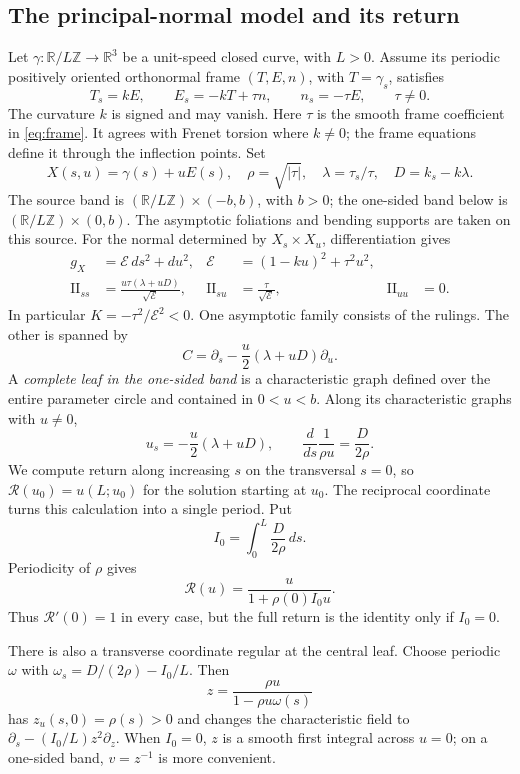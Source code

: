 \documentclass[11pt]{amsart}
\theoremstyle{definition}
\theoremstyle{remark}
\newcommand{\R}{\mathbb R}\newcommand{\Sph}{\mathbb S}
\newcommand{\II}{\mathrm{II}}\newcommand{\Gmap}{\mathcal G}
\numberwithin{equation}{section}
\begin{document}
\subsection{The principal-normal model and its return}
Let $\gamma:\R/L\mathbb Z\to\R^3$ be a unit-speed closed curve,
with $L>0$. Assume its
periodic positively oriented orthonormal frame $(T,E,n)$, with
$T=\gamma_s$, satisfies
\begin{equation}\label{eq:frame}
 T_s=kE,\qquad E_s=-kT+\tau n,\qquad n_s=-\tau E,
 \qquad \tau\ne0.
\end{equation}
The curvature $k$ is signed and may vanish. Here $\tau$ is the
smooth frame coefficient in \eqref{eq:frame}. It agrees with Frenet
torsion where $k\ne0$; the frame equations define it through the
inflection points. Set
\[
 X(s,u)=\gamma(s)+uE(s),\quad \rho=\sqrt{|\tau|},\quad
 \lambda=\tau_s/\tau,\quad D=k_s-k\lambda.
\]
The source band is $(\R/L\mathbb Z)\times(-b,b)$, with $b>0$;
the one-sided band below is $(\R/L\mathbb Z)\times(0,b)$.
The asymptotic foliations and bending supports are taken on this source.
For the normal determined by $X_s\times X_u$, differentiation gives
\begin{align}\label{eq:ruled-II}
 g_X&=\mathcal E\,ds^2+du^2,
 &\mathcal E&=(1-ku)^2+\tau^2u^2,\\
 \II_{ss}&=\frac{u\tau(\lambda+uD)}{\sqrt{\mathcal E}},
 &\II_{su}&=\frac\tau{\sqrt{\mathcal E}},
 &\II_{uu}&=0.\nonumber
\end{align}
In particular $K=-\tau^2/\mathcal E^2<0$. One asymptotic family consists
of the rulings. The other is spanned by
\[
 C=\partial_s-\frac u2(\lambda+uD)\partial_u.
\]
A \emph{complete leaf in the one-sided band} is a characteristic graph
defined over the entire parameter circle and contained in $0<u<b$.
Along its characteristic graphs with $u\ne0$,
\[
 u_s=-\frac u2(\lambda+uD),\qquad
 \frac d{ds}\frac1{\rho u}=\frac D{2\rho}.
\]
We compute return along increasing $s$ on the transversal $s=0$,
so $\mathcal R(u_0)=u(L;u_0)$ for the solution starting at $u_0$.
The reciprocal coordinate turns this calculation into a single period. Put
\[
 I_0=\int_0^L\frac D{2\rho}\,ds.
\]
Periodicity of $\rho$ gives
\begin{equation}\label{eq:return}
 \mathcal R(u)=\frac{u}{1+\rho(0)I_0u}.
\end{equation}
Thus $\mathcal R'(0)=1$ in every case, but the full return is the identity
only if $I_0=0$.

There is also a transverse coordinate regular at the central leaf.
Choose periodic $\omega$ with $\omega_s=D/(2\rho)-I_0/L$. Then
\begin{equation}\label{eq:regular-holonomy-coordinate}
 z=\frac{\rho u}{1-\rho u\omega(s)}
\end{equation}
has $z_u(s,0)=\rho(s)>0$ and changes the characteristic field to
$\partial_s-(I_0/L)z^2\partial_z$. When $I_0=0$, $z$ is a smooth first
integral across $u=0$; on a one-sided band, $v=z^{-1}$ is more convenient.
\end{document}
